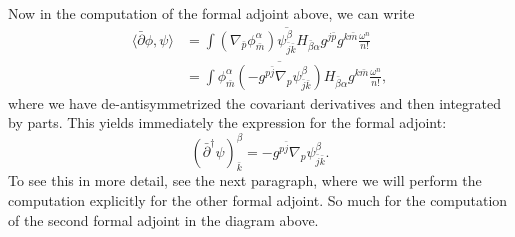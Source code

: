 \documentclass{../mathnotes}
\begin{document}
Now in the computation of the formal adjoint above, we can write
\begin{align*}
    \langle\bar\partial\phi,\psi\rangle&=\int (\nabla_{\bar p}\phi^\alpha_{\bar m})\overline{\psi^\beta_{\bar j\bar k}}H_{\bar\beta\alpha}g^{j\bar p}g^{k\bar m}\frac{\omega^n}{n!}\\
    &=\int\phi^\alpha_{\bar m}\overline{(-g^{p\bar j}\nabla_p\psi^{\beta}_{\bar j\bar k})}H_{\bar\beta\alpha}g^{k\bar m}\frac{\omega^n}{n!},
\end{align*}
where we have de-antisymmetrized the covariant derivatives and then integrated by parts. This yields immediately the expression for the formal adjoint:
\[(\bar\partial^\dagger\psi)_{\bar k}^\beta=-g^{p\bar j}\nabla_p\psi^{\beta}_{\bar j\bar k}.\]
To see this in more detail, see the next paragraph, where we will perform the computation explicitly for the other formal adjoint.
So much for the computation of the second formal adjoint in the diagram above.
\end{document}
